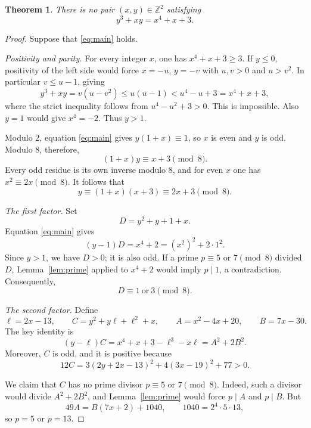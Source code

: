\documentclass[11pt,a4paper]{article}
\newtheorem{theorem}{Theorem}
\newcommand{\Z}{\mathbb Z}
\begin{document}
\begin{theorem}
There is no pair $(x,y)\in\Z^2$ satisfying
\begin{equation}\label{eq:main}
 y^3+xy=x^4+x+3.
\end{equation}
\end{theorem}

\begin{proof}
Suppose that \eqref{eq:main} holds.

\textit{Positivity and parity.}
For every integer $x$, one has $x^4+x+3\geq3$.
If $y\leq0$, positivity of the left side would force
$x=-u$, $y=-v$ with $u,v>0$ and $u>v^2$. In particular $v\leq u-1$, giving
\[
 y^3+xy=v(u-v^2)\leq u(u-1)<u^4-u+3=x^4+x+3,
\]
where the strict inequality follows from $u^4-u^2+3>0$.
This is impossible. Also $y=1$ would give $x^4=-2$. Thus $y>1$.

Modulo $2$, equation \eqref{eq:main} gives $y(1+x)\equiv1$, so
$x$ is even and $y$ is odd. Modulo $8$, therefore,
\[
 (1+x)y\equiv x+3\pmod8.
\]
Every odd residue is its own inverse modulo $8$, and for even $x$ one has
$x^2\equiv2x\pmod8$. It follows that
\begin{equation}\label{eq:parity}
 y\equiv(1+x)(x+3)\equiv2x+3\pmod8.
\end{equation}

\textit{The first factor.}
Set
\[
 D=y^2+y+1+x.
\]
Equation \eqref{eq:main} gives
\begin{equation}\label{eq:first}
 (y-1)D=x^4+2=(x^2)^2+2\cdot1^2.
\end{equation}
Since $y>1$, we have $D>0$; it is also odd. If a prime
$p\equiv5$ or $7\pmod8$ divided $D$, Lemma~\ref{lem:prime} applied to
$x^4+2$ would imply $p\mid1$, a contradiction. Consequently,
\begin{equation}\label{eq:Dres}
 D\equiv1\ \text{or}\ 3\pmod8.
\end{equation}

\textit{The second factor.}
Define
\[
 \ell=2x-13,\qquad
 C=y^2+y\ell+\ell^2+x,\qquad
 A=x^2-4x+20,\qquad B=7x-30.
\]
The key identity is
\begin{equation}\label{eq:second}
 (y-\ell)C
 =x^4+x+3-\ell^3-x\ell
 =A^2+2B^2.
\end{equation}
Moreover, $C$ is odd, and it is positive because
\begin{equation}\label{eq:positive}
 12C=3(2y+2x-13)^2+4(3x-19)^2+77>0.
\end{equation}

We claim that $C$ has no prime divisor $p\equiv5$ or $7\pmod8$.
Indeed, such a divisor would divide $A^2+2B^2$, and
Lemma~\ref{lem:prime} would force $p\mid A$ and $p\mid B$.
But
\begin{equation}\label{eq:exceptional}
 49A=B(7x+2)+1040,\qquad 1040=2^4\cdot5\cdot13,
\end{equation}
so $p=5$ or $p=13$.


\end{proof}
\end{document}
